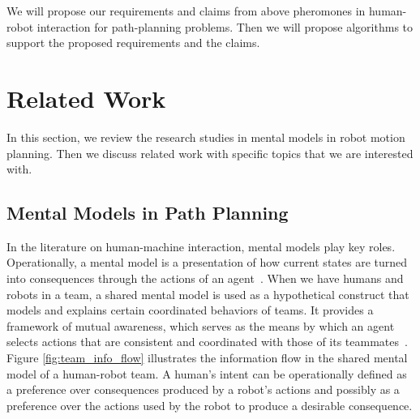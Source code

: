 \documentclass[phd]{byuprop}
\begin{document}
We will propose our requirements and claims from above pheromones in human-robot interaction for path-planning problems.
Then we will propose algorithms to support the proposed requirements and the claims.

\section{Related Work}
\label{sec:related_work}

In this section, we review the research studies in mental models in robot motion planning.
Then we discuss related work with specific topics that we are interested with.

\subsection{Mental Models in Path Planning}
\label{sec:related_work:mental_models_in_path_planning}

In the literature on human-machine interaction, mental models play key roles.
Operationally, a mental model is a presentation of how current states are turned into consequences through the actions of an agent~\cite{gray2014manipulating}.
When we have humans and robots in a team, a shared mental model is used as a hypothetical construct that models and explains certain coordinated behaviors of teams.
It provides a framework of mutual awareness, which serves as the means by which an agent selects actions that are consistent and coordinated with those of its teammates~\cite{nikolaidis2012human,Yen_implementingshared,FSS149109,Jonker:2010:SMM:2018118.2018128,Neerincx2011,Mathieu2000,Kennedy2007}.
Figure \ref{fig:team_info_flow} illustrates the information flow in the shared mental model of a human-robot team.
A human's intent can be operationally defined as a preference over consequences produced by a robot's actions and possibly as a preference over the actions used by the robot to produce a desirable consequence.
\end{document}
